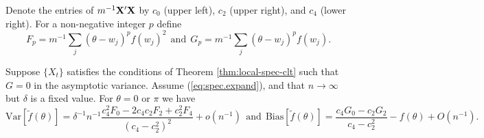 \documentclass[12p E.Lt,psfig]{article} %
\def\tends{\rightarrow}
\begin{document}
    Denote the entries of $m^{-1} {\bf X}^{\prime} {\bf X}$ by $c_0$ (upper left), $c_2$ (upper right), and
  $c_4$ (lower right).  For a non-negative integer  $p$ define
\[
   F_p = m^{-1} \sum_j {(\theta - w_j)}^p {f (w_j)}^2  
\ \ \mbox{and} \ \  G_p = m^{-1} \sum_j {(\theta - w_j)}^p f(w_j).
\]
%
%

\begin{proposition}
\label{prop:local-spec-biasandvar}
      Suppose $\{ X_t \}$  %
 satisfies the conditions of Theorem \ref{thm:local-spec-clt}
      such that $G = 0$ in the asymptotic variance.   Assume (\ref{eq:spec.expand}),
and that $n \tends \infty$  but    $\delta $ is a fixed value. For
          $\theta = 0$ or $ \pi$ we have
\[
  \mbox{Var} [ \tilde{f} (\theta) ]  =   \delta^{-1}  n^{-1}
  \frac{ c_4^2 F_0 - 2 c_4 c_2 F_2 + c_2^2 F_4 }{ {(c_4 - c_2^2)}^2 }
  + o(n^{-1})
\ \ \mbox{and} \ \    \mbox{Bias} [ \tilde{f} (\theta) ]  = 
 \frac{ c_4 G_0 - c_2 G_2 }{ c_4 - c_2^2 }    -  f(\theta)  
  + O(n^{-1}).
  \]
\end{proposition}
\end{document}
